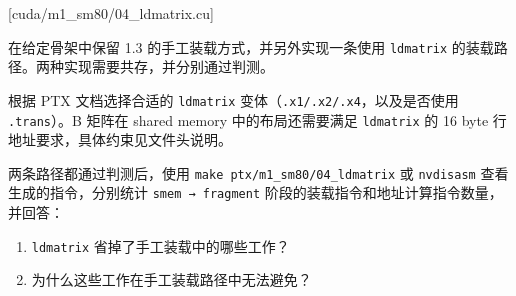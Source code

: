 \documentclass[11pt,a4paper,fontset=fandol]{ctexart}
\begin{document}
[cuda/m1\_sm80/04\_ldmatrix.cu]

在给定骨架中保留 1.3 的手工装载方式，并另外实现一条使用
\texttt{ldmatrix} 的装载路径。两种实现需要共存，并分别通过判测。

根据 PTX 文档选择合适的 \texttt{ldmatrix}
变体（\texttt{.\allowbreak{}x1/\allowbreak{}.\allowbreak{}x2/\allowbreak{}.\allowbreak{}x4}，以及是否使用
\texttt{.\allowbreak{}trans}）。B 矩阵在 shared memory
中的布局还需要满足 \texttt{ldmatrix} 的 16 byte
行地址要求，具体约束见文件头说明。

两条路径都通过判测后，使用
\texttt{make\ ptx/\allowbreak{}m1\_\allowbreak{}sm80/\allowbreak{}04\_\allowbreak{}ldmatrix}
或 \texttt{nvdisasm} 查看生成的指令，分别统计 \texttt{smem\ →\ fragment}
阶段的装载指令和地址计算指令数量，并回答：

\begin{enumerate}
\def\labelenumi{(\alph{enumi})}
\item
  \texttt{ldmatrix} 省掉了手工装载中的哪些工作？
\item
  为什么这些工作在手工装载路径中无法避免？
\end{enumerate}
\end{document}
